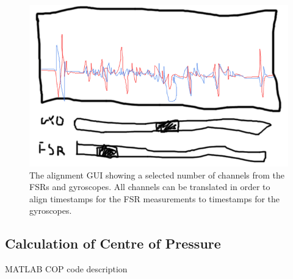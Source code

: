 \begin{figure}[H]
	\includegraphics[width=.6\textwidth]{figures/alignGUI}
	\caption{The alignment GUI showing a selected number of channels from the FSRs and gyroscopes. All channels can be translated in order to align timestamps for the FSR measurements to timestamps for the gyroscopes.}
	\label{fig:alignGUI}  %
\end{figure}


\subsection{Calculation of Centre of Pressure}
MATLAB COP code description
